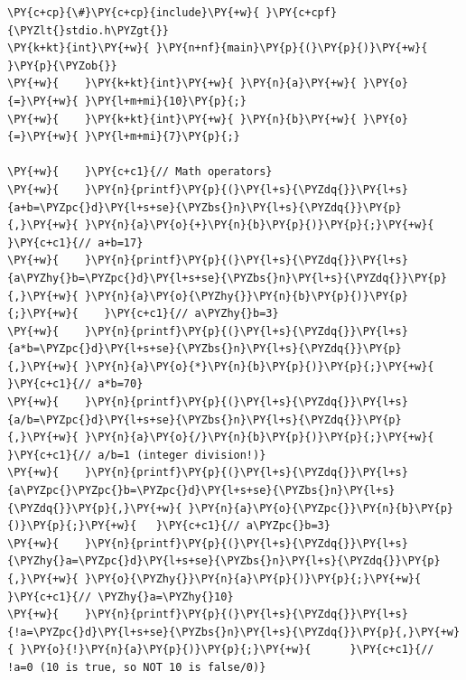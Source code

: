 \begin{Verbatim}[label=\makebox{\url{https://github.com/lucabaldini/cmepda/tree/master/slides/latex/snippets/operators.c}},commandchars=\\\{\}]
\PY{c+cp}{\#}\PY{c+cp}{include}\PY{+w}{ }\PY{c+cpf}{\PYZlt{}stdio.h\PYZgt{}}
\PY{k+kt}{int}\PY{+w}{ }\PY{n+nf}{main}\PY{p}{(}\PY{p}{)}\PY{+w}{ }\PY{p}{\PYZob{}}
\PY{+w}{    }\PY{k+kt}{int}\PY{+w}{ }\PY{n}{a}\PY{+w}{ }\PY{o}{=}\PY{+w}{ }\PY{l+m+mi}{10}\PY{p}{;}
\PY{+w}{    }\PY{k+kt}{int}\PY{+w}{ }\PY{n}{b}\PY{+w}{ }\PY{o}{=}\PY{+w}{ }\PY{l+m+mi}{7}\PY{p}{;}

\PY{+w}{    }\PY{c+c1}{// Math operators}
\PY{+w}{    }\PY{n}{printf}\PY{p}{(}\PY{l+s}{\PYZdq{}}\PY{l+s}{a+b=\PYZpc{}d}\PY{l+s+se}{\PYZbs{}n}\PY{l+s}{\PYZdq{}}\PY{p}{,}\PY{+w}{ }\PY{n}{a}\PY{o}{+}\PY{n}{b}\PY{p}{)}\PY{p}{;}\PY{+w}{    }\PY{c+c1}{// a+b=17}
\PY{+w}{    }\PY{n}{printf}\PY{p}{(}\PY{l+s}{\PYZdq{}}\PY{l+s}{a\PYZhy{}b=\PYZpc{}d}\PY{l+s+se}{\PYZbs{}n}\PY{l+s}{\PYZdq{}}\PY{p}{,}\PY{+w}{ }\PY{n}{a}\PY{o}{\PYZhy{}}\PY{n}{b}\PY{p}{)}\PY{p}{;}\PY{+w}{    }\PY{c+c1}{// a\PYZhy{}b=3}
\PY{+w}{    }\PY{n}{printf}\PY{p}{(}\PY{l+s}{\PYZdq{}}\PY{l+s}{a*b=\PYZpc{}d}\PY{l+s+se}{\PYZbs{}n}\PY{l+s}{\PYZdq{}}\PY{p}{,}\PY{+w}{ }\PY{n}{a}\PY{o}{*}\PY{n}{b}\PY{p}{)}\PY{p}{;}\PY{+w}{    }\PY{c+c1}{// a*b=70}
\PY{+w}{    }\PY{n}{printf}\PY{p}{(}\PY{l+s}{\PYZdq{}}\PY{l+s}{a/b=\PYZpc{}d}\PY{l+s+se}{\PYZbs{}n}\PY{l+s}{\PYZdq{}}\PY{p}{,}\PY{+w}{ }\PY{n}{a}\PY{o}{/}\PY{n}{b}\PY{p}{)}\PY{p}{;}\PY{+w}{    }\PY{c+c1}{// a/b=1 (integer division!)}
\PY{+w}{    }\PY{n}{printf}\PY{p}{(}\PY{l+s}{\PYZdq{}}\PY{l+s}{a\PYZpc{}\PYZpc{}b=\PYZpc{}d}\PY{l+s+se}{\PYZbs{}n}\PY{l+s}{\PYZdq{}}\PY{p}{,}\PY{+w}{ }\PY{n}{a}\PY{o}{\PYZpc{}}\PY{n}{b}\PY{p}{)}\PY{p}{;}\PY{+w}{   }\PY{c+c1}{// a\PYZpc{}b=3}
\PY{+w}{    }\PY{n}{printf}\PY{p}{(}\PY{l+s}{\PYZdq{}}\PY{l+s}{\PYZhy{}a=\PYZpc{}d}\PY{l+s+se}{\PYZbs{}n}\PY{l+s}{\PYZdq{}}\PY{p}{,}\PY{+w}{ }\PY{o}{\PYZhy{}}\PY{n}{a}\PY{p}{)}\PY{p}{;}\PY{+w}{      }\PY{c+c1}{// \PYZhy{}a=\PYZhy{}10}
\PY{+w}{    }\PY{n}{printf}\PY{p}{(}\PY{l+s}{\PYZdq{}}\PY{l+s}{!a=\PYZpc{}d}\PY{l+s+se}{\PYZbs{}n}\PY{l+s}{\PYZdq{}}\PY{p}{,}\PY{+w}{ }\PY{o}{!}\PY{n}{a}\PY{p}{)}\PY{p}{;}\PY{+w}{      }\PY{c+c1}{// !a=0 (10 is true, so NOT 10 is false/0)}


\end{Verbatim}
